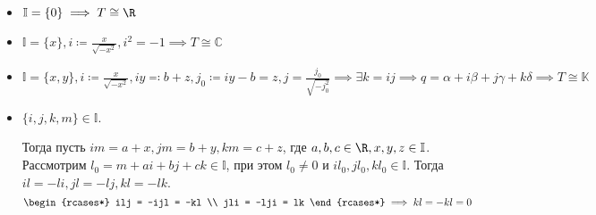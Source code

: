 \begin{theorem}\itemfix
	\begin{itemize}
		\item \(\mathbb{I} = \{0\} \implies T \cong \R\)
		\item \(\mathbb{I} = \{x\}, i \coloneqq \frac{x}{\sqrt{-x^2}}, i^2 = -1 \implies T \cong \mathbb{C}\)
		\item \(\mathbb{I} = \{x, y\}, i \coloneqq \frac{x}{\sqrt{-x^2}}, iy \eqqcolon b + z, j_0 \coloneqq iy - b = z, j = \frac{j_0}{\sqrt{-j_0^2}} \implies \exists k = ij \implies q = \alpha + i \beta + j \gamma + k \delta \implies T \cong \mathbb{K}\)
		\item \(\{i, j, k, m\} \in \mathbb{I}\).

		      Тогда пусть \(im = a + x, jm = b + y, km = c + z\), где \(a, b, c \in \R, x, y, z \in \mathbb{I}\).
		      Рассмотрим \(l_0 = m + ai + bj + ck \in \mathbb{I}\), при этом \(l_0 \neq 0\) и \(il_0, jl_0, kl_0 \in \mathbb{I}\). Тогда \(il = -li, jl = -lj, kl = -lk\).
		      \[
                  \begin{rcases*}
                      ilj = -ijl = -kl \\
                      jli = -lji = lk
                  \end{rcases*} \implies kl = -kl = 0
              \]
	\end{itemize}
\end{theorem}
